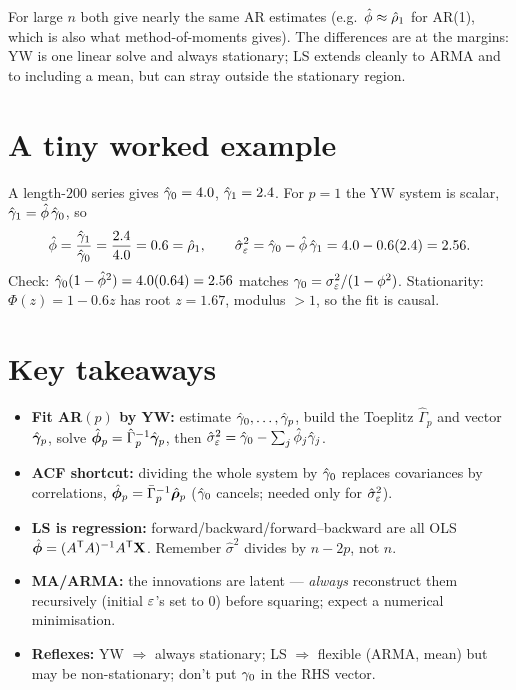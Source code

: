\documentclass[11pt]{article}
\begin{document}
\begin{intu}
For large $n$ both give nearly the same AR estimates (e.g.\ $\hat\phi\approx\hat{\rho}_1$ for AR(1), which is also what method-of-moments gives). The differences are at the margins: YW is one linear solve and always stationary; LS extends cleanly to ARMA and to including a mean, but can stray outside the stationary region.
\end{intu}

\section*{A tiny worked example}

\begin{exmpl}
A length-$200$ series gives $\hat{\gamma}_0=4.0$, $\hat{\gamma}_1=2.4$. For $p=1$ the YW system is scalar, $\hat{\gamma}_1=\hat\phi\,\hat{\gamma}_0$, so
\[
\hat\phi=\frac{\hat{\gamma}_1}{\hat{\gamma}_0}=\frac{2.4}{4.0}=0.6=\hat{\rho}_1,
\qquad
\hat\sigma_\varepsilon^2=\hat{\gamma}_0-\hat\phi\,\hat{\gamma}_1=4.0-0.6(2.4)=2.56.
\]
Check: $\hat{\gamma}_0(1-\hat\phi^2)=4.0(0.64)=2.56$ matches $\gamma_0=\sigma_\varepsilon^2/(1-\phi^2)$. Stationarity: $\Phi(z)=1-0.6z$ has root $z=1.67$, modulus $>1$, so the fit is causal.
\end{exmpl}

\section*{Key takeaways}

\begin{retenir}
\begin{itemize}
\item \textbf{Fit AR$(p)$ by YW:} estimate $\hat{\gamma}_0,\dots,\hat{\gamma}_p$, build the Toeplitz $\hat\Gamma_p$ and vector $\hat{\bm{\gamma}}_p$, solve $\hat{\bm\phi}_p=\hat\Gamma_p^{-1}\hat{\bm{\gamma}}_p$, then $\hat\sigma_\varepsilon^2=\hat{\gamma}_0-\sum_j\hat\phi_j\hat{\gamma}_j$.
\item \textbf{ACF shortcut:} dividing the whole system by $\hat{\gamma}_0$ replaces covariances by correlations, $\hat{\bm\phi}_p=\bar\Gamma_p^{-1}\hat{\bm{\rho}}_p$ ($\hat{\gamma}_0$ cancels; needed only for $\hat\sigma_\varepsilon^2$).
\item \textbf{LS is regression:} forward/backward/forward--backward are all OLS $\hat{\bm\phi}=(A^{\mathsf{T}} A)^{-1}A^{\mathsf{T}}\mathbf X$. Remember $\hat\sigma^2$ divides by $n-2p$, not $n$.
\item \textbf{MA/ARMA:} the innovations are latent --- \emph{always} reconstruct them recursively (initial $\varepsilon$'s set to $0$) before squaring; expect a numerical minimisation.
\item \textbf{Reflexes:} YW $\Rightarrow$ always stationary; LS $\Rightarrow$ flexible (ARMA, mean) but may be non-stationary; don't put $\gamma_0$ in the RHS vector.
\end{itemize}
\end{retenir}
\end{document}
